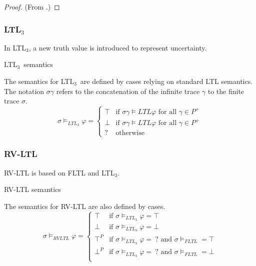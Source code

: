 \documentclass[a4paper]{article}
\newcommand{\tand}{\text{ and }}
\newcommand{\fall}{\text{ for all }}
\newcommand{\ltlt}{LTL$_3$}
\begin{document}
\begin{proof}
  (From \autocite{bauer2010comparing}.)
\end{proof}

\subsubsection{\ltlt} In \ltlt, a new truth value is introduced to represent uncertainty.

\begin{defn}{\ltlt\ semantics}

  The semantics for \ltlt\ are defined by cases relying on standard LTL semantics. The notation $\sigma\gamma$ refers to the concatenation of the infinite trace $\gamma$ to the finite trace $\sigma$.
  \[\sigma\vDash_{LTL_3}\varphi =
    \begin{cases}
      \top & \text{if } \sigma\gamma \vDash{LTL} \varphi \fall \gamma \in P^+\\
      \bot & \text{if } \sigma\gamma \vDash{LTL} \varphi \fall \gamma \in P^+\\
      ? & \text{otherwise}
    \end{cases}
    \]
\end{defn}

\subsubsection{RV-LTL} RV-LTL is based on FLTL and \ltlt.

\begin{defn}{RV-LTL semantics}

  The semantics for RV-LTL are also defined by cases.
  \[\sigma\vDash_{RVLTL}\varphi =
    \begin{cases}
      \top & \text{if } \sigma \vDash_{LTL_3} \varphi = \top\\
      \bot & \text{if } \sigma \vDash_{LTL_3} \varphi = \bot\\
      \top^P & \text{if } \sigma \vDash_{LTL_3} \varphi = ~?\tand \sigma\vDash_{FLTL} = \top \\
      \bot^P & \text{if } \sigma \vDash_{LTL_3} \varphi = ~?\tand \sigma\vDash_{FLTL} = \bot \\

    \end{cases}
  \]
\end{defn}
\end{document}
